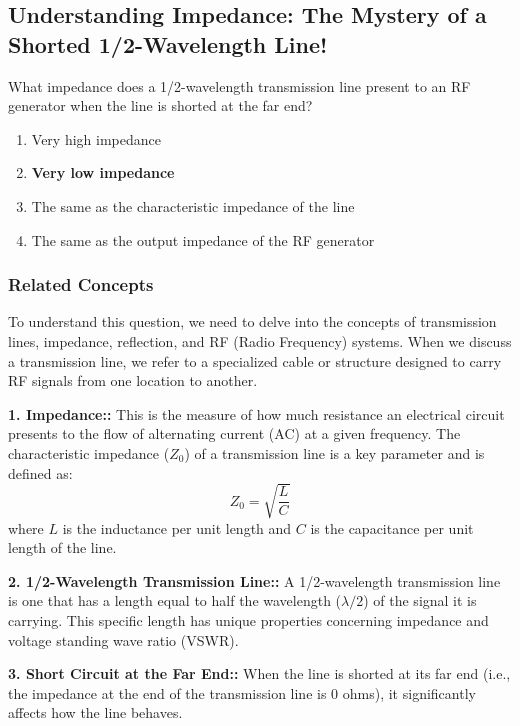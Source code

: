 \subsection{Understanding Impedance: The Mystery of a Shorted 1/2-Wavelength Line!}

\begin{tcolorbox}[colback=gray!10, colframe=black, title=E9F04] What impedance does a 1/2-wavelength transmission line present to an RF generator when the line is shorted at the far end?
\begin{enumerate}[label=\Alph*.]
    \item Very high impedance
    \item \textbf{Very low impedance}
    \item The same as the characteristic impedance of the line
    \item The same as the output impedance of the RF generator
\end{enumerate} \end{tcolorbox}

\subsubsection{Related Concepts}

To understand this question, we need to delve into the concepts of transmission lines, impedance, reflection, and RF (Radio Frequency) systems. When we discuss a transmission line, we refer to a specialized cable or structure designed to carry RF signals from one location to another. 

\textbf{1. Impedance::} This is the measure of how much resistance an electrical circuit presents to the flow of alternating current (AC) at a given frequency. The characteristic impedance (\(Z_0\)) of a transmission line is a key parameter and is defined as:
\[
Z_0 = \sqrt{\frac{L}{C}}
\]
where \(L\) is the inductance per unit length and \(C\) is the capacitance per unit length of the line.

\textbf{2. 1/2-Wavelength Transmission Line::} A 1/2-wavelength transmission line is one that has a length equal to half the wavelength (\(\lambda/2\)) of the signal it is carrying. This specific length has unique properties concerning impedance and voltage standing wave ratio (VSWR).

\textbf{3. Short Circuit at the Far End::} When the line is shorted at its far end (i.e., the impedance at the end of the transmission line is 0 ohms), it significantly affects how the line behaves.

